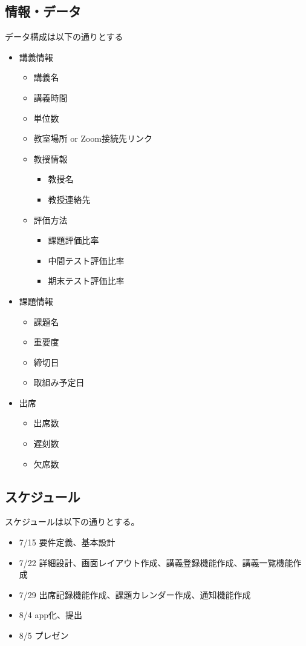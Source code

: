 \documentclass[a4paper, 11pt, titlepage]{jsarticle}
\begin{document}
\subsection{情報・データ}
データ構成は以下の通りとする
\begin{itemize}
\item 講義情報
\begin{itemize}
  \item 講義名
  \item 講義時間
  \item 単位数
  \item 教室場所 or Zoom接続先リンク
  \item 教授情報
  \begin{itemize}
    \item 教授名
    \item 教授連絡先
  \end{itemize}
  \item 評価方法
  \begin{itemize}
    \item 課題評価比率
    \item 中間テスト評価比率
    \item 期末テスト評価比率
  \end{itemize}
\end{itemize}
\item 課題情報
\begin{itemize}
  \item 課題名
  \item 重要度
  \item 締切日
  \item 取組み予定日
\end{itemize}
\item 出席
\begin{itemize}
\item 出席数
\item 遅刻数
\item 欠席数
\end{itemize}
\end{itemize}


\subsection{スケジュール}
スケジュールは以下の通りとする。
\begin{itemize}
\item 7/15 要件定義、基本設計
\item 7/22 詳細設計、画面レイアウト作成、講義登録機能作成、講義一覧機能作成
\item 7/29 出席記録機能作成、課題カレンダー作成、通知機能作成
\item 8/4 app化、提出
\item 8/5 プレゼン
\end{itemize}
\end{document}
